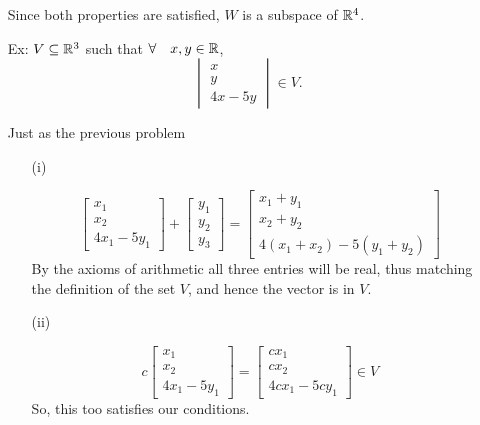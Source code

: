 \documentclass[reqno]{amsart}
\theoremstyle{definition}
\begin{document}
\begin{enumerate}
\begin{itemize}
\end{itemize}

Since both properties are satisfied, $W$ is a subspace of $\mathbb{R}^4$.


\item[Ex:  ]  $V \subseteq \mathbb{R}^3$ such that $\forall\quad x,y\in \mathbb{R}$,
%
\begin{equation*}
\begin{vmatrix}
x\\
y\\
4x-5y
\end{vmatrix}\in V.
\end{equation*}

Just as the previous problem

\begin{itemize}

\item[(i)  ]  

\begin{equation*}
\begin{bmatrix}
x_1\\
x_2\\
4x_1 - 5y_1
\end{bmatrix} + \begin{bmatrix}
y_1\\
y_2\\
y_3
\end{bmatrix} = \begin{bmatrix}
x_1 + y_1\\
x_2 + y_2\\
4(x_1 + x_2) - 5(y_1 + y_2)
\end{bmatrix}
\end{equation*}
%
By the axioms of arithmetic all three entries will be real, thus matching the definition of the set $V$, and hence the vector is in $V$.

\item[(ii)  ]  

\begin{equation*}
c\begin{bmatrix}
x_1\\
x_2\\
4x_1 - 5y_1
\end{bmatrix} = \begin{bmatrix}
cx_1\\
cx_2\\
4cx_1 - 5cy_1
\end{bmatrix} \in V
\end{equation*}
%
So, this too satisfies our conditions.


\end{itemize}
\end{enumerate}
\end{document}
